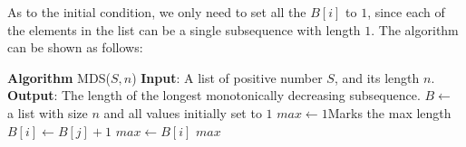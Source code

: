 \documentclass[11pt]{article}
\begin{document}
As to the initial condition, we only need to set all the $B[i]$ to $1$, since each of the elements in the list can be a single subsequence with length $1$. The algorithm can be shown as follows:

\begin{algorithmic}
	\State \textbf{Algorithm} MDS($S,n$)
	\State \textbf{Input}: A list of positive number $S$, and its length $n$.
	\State \textbf{Output}: The length of the longest monotonically decreasing subsequence.
	\State $B\gets$ a list with size $n$ and all values initially set to $1$
	\State $max\gets1$\Comment Marks the max length
				\State $B[i]\gets B[j]+1$
			\EndIf
		\EndFor
			\State $max\gets B[i]$
		\EndIf
	\EndFor
	\State \Return $max$
\end{algorithmic}
\end{document}
